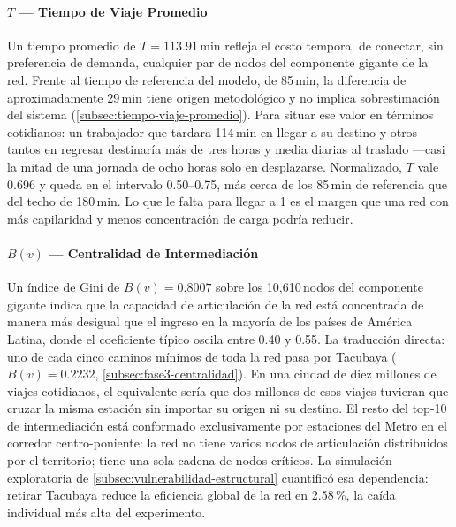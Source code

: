 \paragraph{$T$ --- Tiempo de Viaje Promedio}

Un tiempo promedio de $T = 113.91$\,min refleja el costo temporal de conectar,
sin preferencia de demanda, cualquier par de nodos del componente gigante de la
red. Frente al tiempo de referencia del modelo, de 85\,min, la diferencia de
aproximadamente 29\,min tiene origen metodológico y no implica sobrestimación
del sistema (\autoref{subsec:tiempo-viaje-promedio}). Para situar ese valor en
términos cotidianos: un trabajador que tardara 114\,min en llegar a su destino y
otros tantos en regresar destinaría más de tres horas y media diarias al
traslado ---casi la mitad de una jornada de ocho horas solo en desplazarse.
Normalizado, $T$ vale 0.696 y queda en el intervalo 0.50--0.75, más cerca de
los 85\,min de referencia que del techo de 180\,min. Lo que le falta para llegar
a 1 es el margen que una red con más capilaridad y menos concentración de carga
podría reducir.

\paragraph{$B(v)$ --- Centralidad de Intermediación}

Un índice de Gini de $B(v) = 0.8007$ sobre los 10{,}610\,nodos del componente
gigante indica que la capacidad de articulación de la red está concentrada de
manera más desigual que el ingreso en la mayoría de los países de América
Latina, donde el coeficiente típico oscila entre 0.40 y 0.55. La traducción
directa: uno de cada cinco caminos mínimos de toda la red pasa por Tacubaya
($B(v) = 0.2232$, \autoref{subsec:fase3-centralidad}). En una ciudad de diez
millones de viajes cotidianos, el equivalente sería que dos millones de esos
viajes tuvieran que cruzar la misma estación sin importar su origen ni su
destino. El resto del top-10 de intermediación está conformado exclusivamente
por estaciones del Metro en el corredor centro-poniente: la red no tiene varios
nodos de articulación distribuidos por el territorio; tiene una sola cadena de
nodos críticos. La simulación exploratoria de
\autoref{subsec:vulnerabilidad-estructural} cuantificó esa dependencia: retirar
Tacubaya reduce la eficiencia global de la red en 2.58\,\%, la caída individual
más alta del experimento.

